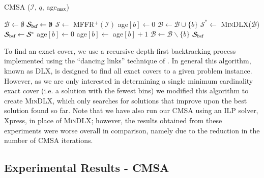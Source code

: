 \documentclass[a4paper,11pt,authoryear]{elsarticle}
\newcommand{\algorithmicto}{\textbf{ to }}
\newcommand{\To}{\algorithmicto}
\newcommand{\chng}[1]{{\color{myRed}#1}}
\begin{document}
\begin{algorithm}[h!]
\caption{CMSA ($\mathcal{I}$, $q$, age$_\textup{max}$)}
\small
\begin{algorithmic}[1]
	\State $\mathcal{B} \gets \emptyset$
	\State $\mathcal{S}_{\textup{bsf}} \gets \emptyset$
		\For{$i\gets 1 \To q$}
			\State $\mathcal{S} \gets$ MFFR$^+(\mathcal{I})$
				\State age$[b] \gets 0$
				\State $\mathcal{B} \gets \mathcal{B} \cup \{b\}$
			\EndFor
		\EndFor
		\State $\mathcal{S}^* \gets$ \textsc{MinDLX}($\mathcal{B}$)
			\State $\mathcal{S}_{\textup{bsf}} \gets \mathcal{S}^*$
		\EndIf
				\State age$[b] \gets 0$
				\State age$[b] \gets$ age$[b] + 1$
					\State $\mathcal{B} \gets \mathcal{B} \backslash \{b\}$
				\EndIf
			\EndIf		
		\EndFor
	\EndWhile
	\Return $\mathcal{S}_{\textup{bsf}}$
\end{algorithmic}
\label{alg:cmsa}	
\end{algorithm}	

\noindent To find an exact cover, we use a recursive depth-first backtracking process implemented using the ``dancing links'' technique of \cite{knuth2000}. In general this algorithm, known as DLX, is designed to find all exact covers to a given problem instance. However, as we are only interested in determining a single minimum cardinality exact cover (i.e. a solution with the fewest bins) we modified this algorithm to create \textsc{MinDLX}, which only searches for solutions that improve upon the best solution found so far. \chng{Note that we have also run our CMSA using an ILP solver, Xpress, in place of \textsc{MinDLX}; however, the results obtained from these experiments were worse overall in comparison, namely due to the reduction in the number of CMSA iterations.}


\subsection{Experimental Results - CMSA}
\label{sub:expcmsa}
\end{document}
